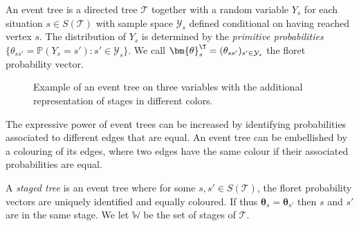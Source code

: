 \begin{definition}
An event tree is a directed tree $\mathcal{T}$ together with a random variable $Y_s$ for each situation $s\in S(\mathcal{T})$ with sample space $\mathcal{Y}_s$ defined conditional on having reached vertex $s$. The distribution of $Y_s$ is determined by the \textit{primitive probabilities} $\{\theta_{ss'}=\mathbb{P}(Y_s=s'): s'\in\mathcal{Y}_s\}$. We call $\bm{\theta}_s^\T=(\theta_{ss'})_{s'\in\mathcal{Y}_s}$ the floret probability vector.
\end{definition}

\begin{figure}
\centerline{
\hspace*{-16mm} }
\caption{Example of an event tree on three variables with the additional representation of stages in different colors. \label{fig:ET}}
\end{figure}

The expressive power of event trees can be increased by identifying probabilities associated to different edges that are equal. An event tree can be embellished by a colouring of its edges, where two edges have the same colour if their associated probabilities are equal.

\begin{definition}
A \emph{staged tree} is an event tree where for some $s
,s'\in S(\mathcal{T})$, the floret probability vectors are uniquely identified \citep[without permuting their meaning,][]{Cowell2014} and equally coloured. If thus $\bm{\theta}_s=\bm{\theta}_{s'}$ then $s$ and $s'$ are in the same stage. We let $\mathbb{W}$ be the set of stages of $\mathcal{T}$.
\end{definition}
  

